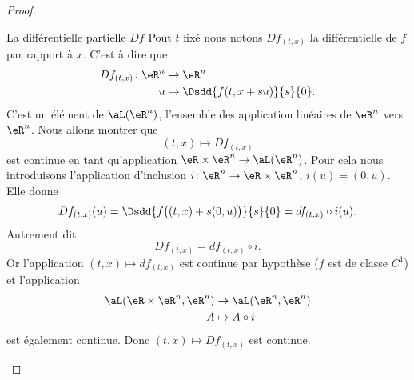 \begin{proof}
    \begin{subproof}
        \item[La différentielle partielle \( Df\)]
            Pout \( t\) fixé nous notons \( Df_{(t,x)}\) la différentielle de \( f\) par rapport à \( x\). C'est à dire que
            \begin{equation}
                \begin{aligned}
                    Df_{(t,x)}\colon \eR^n&\to \eR^n \\
                    u&\mapsto \Dsdd{ f(t,x+su) }{s}{0}. 
                \end{aligned}
            \end{equation}
            C'est un élément de \( \aL(\eR^n)\), l'ensemble des application linéaires de \( \eR^n\) vers \( \eR^n\). Nous allons montrer que
            \begin{equation}
                (t,x)\mapsto Df_{(t,x)} 
            \end{equation}
            est continue en tant qu'application \( \eR\times \eR^n\to\aL(\eR^n)\). Pour cela nous introduisons l'application d'inclusion \( i\colon \eR^n\to \eR\times \eR^n\), \( i(u)=(0,u)\). Elle donne
            \begin{equation}
                Df_{(t,x)}(u)=\Dsdd{ f\big( (t,x)+s(0,u) \big) }{s}{0}=df_{(t,x)}\circ i (u).
            \end{equation}
            Autrement dit
            \begin{equation}
                Df_{(t,x)}=df_{(t,x)}\circ i.
            \end{equation}
            Or l'application \( (t,x)\mapsto df_{(t,x)} \) est continue par hypothèse (\( f\) est de classe \( C^1\)) et l'application
            \begin{equation}        \label{EQooZTAPooCduWcl}
                \begin{aligned}
                     \aL(\eR\times \eR^n,\eR^n)&\to \aL(\eR^n,\eR^n) \\
                    A&\mapsto A\circ i 
                \end{aligned}
            \end{equation}
            est également continue. Donc \( (t,x)\mapsto Df_{(t,x)}\) est continue.
            

\end{subproof}
\end{proof}
